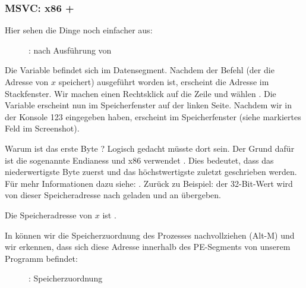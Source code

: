 \clearpage
\subsubsection{MSVC: x86 + \olly}
\myindex{\olly}

Hier sehen die Dinge noch einfacher aus:

\begin{figure}[H]
\centering
{}
\caption{\olly: nach Ausführung von \scanf}
\label{fig:scanf_ex2_olly_1}
\end{figure}

Die Variable befindet sich im Datensegment.
Nachdem der \PUSH Befehl (der die Adresse von $x$ speichert) ausgeführt worden ist,
erscheint die Adresse im Stackfenster. Wir machen einen Rechtsklick auf die Zeile und wählen .
Die Variable erscheint nun im Speicherfenster auf der linken Seite. 
Nachdem wir in der Konsole 123 eingegeben haben, erscheint  im Speicherfenster (siehe markiertes Feld im
Screenshot).

Warum ist das erste Byte ?
Logisch gedacht müsste dort  sein. 
Der Grund dafür ist die sogenannte \gls{Endianess} und x86 verwendet . 
Dies bedeutet, dass das niederwertigste Byte zuerst und das höchstwertigste zuletzt geschrieben werden.
Für mehr Informationen dazu siehe: .
Zurück zu Beispiel: der 32-Bit-Wert wird von dieser Speicheradresse nach \EAX geladen und an \printf übergeben. 

Die Speicheradresse von $x$ ist .

\clearpage
In \olly können wir die Speicherzuordnung des Prozesses nachvollziehen (Alt-M) und wir erkennen, dass sich diese Adresse
innerhalb des  PE-Segments von unserem Programm befindet:

\label{olly_memory_map_example}
\begin{figure}[H]
\centering
{}
\caption{\olly: Speicherzuordnung}
\label{fig:scanf_ex2_olly_2}
\end{figure}

